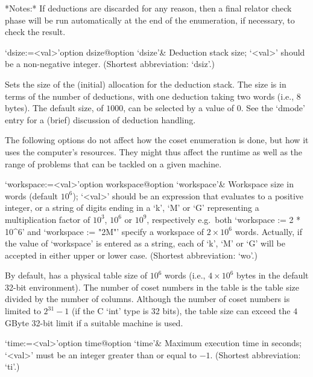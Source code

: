 *Notes:*
If deductions are discarded for any reason, then a final relator check
phase  will be run  automatically at  the end  of the  enumeration, if
necessary, to check the result.

\>`dsize:=<val>'{option dsize}@{option `dsize'}&
Deduction stack size; `<val>' should be a non-negative integer.
(Shortest abbreviation: `dsiz'.)

Sets the  size of  the (initial) allocation  for the  deduction stack.
The size is  in terms of the number of  deductions, with one deduction
taking two words (i.e., 8 bytes).  The default size, of $1000$, can be
selected  by  a value  of  0.   See the  `dmode' entry  for a  (brief)
discussion of deduction handling.

\enditems


The following options do not affect how the coset enumeration is done,
but how it  uses the computer's resources. They  might thus affect the
runtime as  well as  the range of  problems that  can be tackled  on a
given machine.

\beginitems

\>`workspace:=<val>'{option workspace}@{option `workspace'}&
Workspace size in words (default $10^6$);
`<val>' should be an expression that evaluates to a positive  integer,
or a string of digits ending in a  `k',  `M'  or  `G'  representing  a
multiplication  factor  of  $10^3$,  $10^6$  or  $10^9$,  respectively
e.g.~both `workspace := 2 * 10^6' and `workspace :=  "2M"'  specify  a
workspace  of  $2\times10^6$  words.  Actually,  if   the   value   of
`workspace' is entered as a string, each of `k', `M' or  `G'  will  be
accepted in either upper or lower case. (Shortest abbreviation: `wo'.)

By default, {\ACE} has a physical table size of $10^6$ words (i.e., $4
\times 10^6$ bytes in the  default 32-bit environment).  The number of
coset numbers in the table is  the table size divided by the number of
columns.   Although  the  number   of  coset  numbers  is  limited  to
$2^{31}-1$ (if the C `int' type is 32 bits), the table size can exceed
the $4$GByte 32-bit limit if a suitable machine is used.

\>`time:=<val>'{option time}@{option `time'}&
Maximum execution time in seconds; `<val>' must be an integer  greater
than or equal to $-1$. (Shortest abbreviation: `ti'.)

